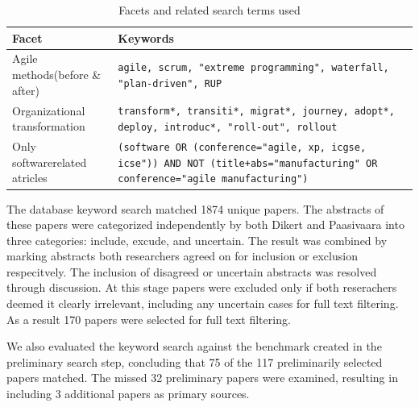\documentclass[preprint,authoryear,12pt]{elsarticle}
\begin{document}
\begin{table}
    \begin{tabular}{ p{} p{} }
        \toprule
        Facet                  & Keywords   \\
        \midrule
        Agile methods\newline (before \& after) &
            \texttt{agile, scrum, "extreme programming",
            waterfall, "plan-driven", RUP}\\
        Organizational transformation &
            \texttt{transform*, transiti*, migrat*, journey, adopt*, deploy, introduc*,
            "roll-out", rollout}\\
        Only software\newline related atricles &
            \texttt{(software OR (conference="agile, xp, icgse, icse"))
            AND NOT (title+abs="manufacturing" OR conference="agile manufacturing")}
        \\
        \bottomrule
    \end{tabular}
    \caption{Facets and related search terms used}
    \label{table:searchterms}
\end{table}

The database keyword search matched 1874 unique papers. The abstracts of these
papers were categorized independently by both Dikert and Paasivaara into three
categories: include, excude, and uncertain. The result was combined by marking
abstracts both researchers agreed on for inclusion or exclusion respecitvely.
The inclusion of disagreed or uncertain abstracts was resolved through
discussion. At this stage papers were excluded only if both reserachers deemed
it clearly irrelevant, including any uncertain cases for full text filtering. As
a result 170 papers were selected for full text filtering.

We also evaluated the keyword search against the benchmark created in the
preliminary search step, concluding that 75 of the 117 preliminarily selected
papers matched. The missed 32 preliminary papers were examined, resulting in
including 3 additional papers as primary sources.

%
%
%
%
%
%
\end{document}
